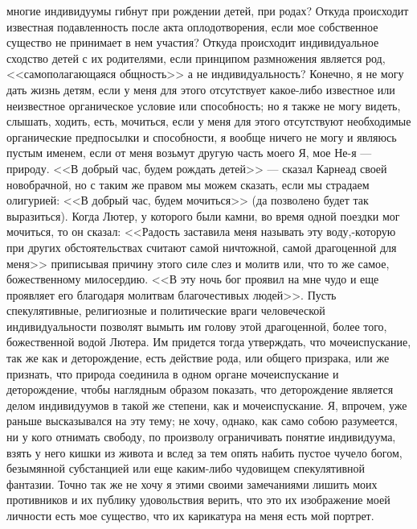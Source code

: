 \documentclass[12pt]{article}
\begin{document}
многие индивидуумы гибнут при рождении детей, при родах? Откуда происходит известная подавленность после акта оплодотворения, если мое собственное существо не принимает в нем участия? Откуда происходит индивидуальное сходство детей с их родителями, если принципом размножения является род, <<самополагающаяся общность>>  а не индивидуальность? Конечно, я не могу дать жизнь детям, если у меня для этого отсутствует какое-либо известное или неизвестное органическое условие или способность; но я также не могу видеть, слышать, ходить, есть, мочиться, если у меня для этого отсутствуют необходимые органические предпосылки и способности, я вообще ничего не могу и являюсь пустым именем, если от меня возьмут другую часть моего Я, мое Не-я --- природу. <<В добрый час, будем рождать детей>>  --- сказал Карнеад своей новобрачной, но с таким же правом мы можем сказать, если мы страдаем олигурией: <<В добрый час, будем мочиться>> (да позволено будет так выразиться). Когда Лютер, у которого были камни, во время одной поездки мог мочиться, то он сказал: <<Радость заставила меня называть эту воду,-которую при других обстоятельствах считают самой ничтожной, самой драгоценной для меня>>  приписывая причину этого силе слез и молитв или, что то же самое, божественному милосердию. <<В эту ночь бог проявил на мне чудо и еще проявляет его благодаря молитвам благочестивых людей>>. Пусть спекулятивные, религиозные и политические враги человеческой индивидуальности позволят вымыть им голову этой драгоценной, более того, божественной водой Лютера. Им придется тогда утверждать, что мочеиспускание, так же как и деторождение, есть действие рода, или общего призрака, или же признать, что природа соединила в одном органе мочеиспускание и деторождение, чтобы наглядным образом показать, что деторождение является делом индивидуумов в такой же степени, как и мочеиспускание. Я, впрочем, уже раньше высказывался на эту тему; не хочу, однако, как само собою разумеется, ни у кого отнимать свободу, по произволу ограничивать понятие индивидуума, взять у него кишки из живота и вслед за тем опять набить пустое чучело богом, безымянной субстанцией или еще каким-либо чудовищем спекулятивной фантазии. Точно так же не хочу я этими своими замечаниями лишить моих противников и их публику удовольствия верить, что это их изображение моей личности есть мое существо, что их карикатура на меня есть мой портрет. 
\end{document}
